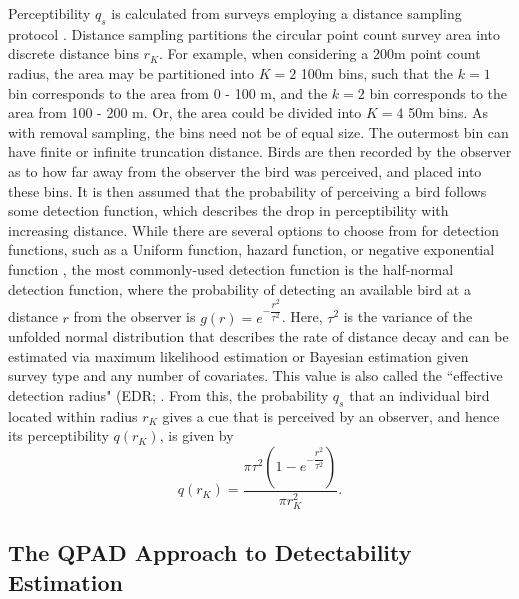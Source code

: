 \par Perceptibility $q_s$ is calculated from surveys employing a distance sampling protocol \citep{buckland_introduction_2001, buckland_distance_2015}. 
Distance sampling partitions the circular point count survey area into discrete distance bins $r_K$. 
For example, when considering a 200m point count radius, the area may be partitioned into $K = 2$ 100m bins, such that the $k = 1$ bin corresponds to the area from 0 - 100 m, and the $k = 2$ bin corresponds to the area from 100 - 200 m. 
Or, the area could be divided into $K = 4$ 50m bins. 
As with removal sampling, the bins need not be of equal size.
The outermost bin can have finite or infinite truncation distance.
Birds are then recorded by the observer as to how far away from the observer the bird was perceived, and placed into these bins.
It is then assumed that the probability of perceiving a bird follows some detection function, which describes the drop in perceptibility with increasing distance.
While there are several options to choose from for detection functions, such as a Uniform function, hazard function, or negative exponential function \citep{buckland_distance_2015}, the most commonly-used detection function is the half-normal detection function, where the probability of detecting an available bird at a distance $r$ from the observer is $g(r) = e^{-\dfrac{r^2}{\tau^2}}$. Here, $\tau^2$ is the variance of the unfolded normal distribution that describes the rate of distance decay and can be estimated via maximum likelihood estimation or Bayesian estimation given survey type and any number of covariates. 
This value is also called the ``effective detection radius" (EDR; \citet{buckland_introduction_2001}.
From this, the probability $q_s$ that an individual bird located within radius $r_K$ gives a cue that is perceived by an observer, and hence its perceptibility $q(r_K)$, is given by
\begin{equation*}
	q(r_K) = \dfrac{\pi \tau^2 \left(1 - e^{-\dfrac{r^2}{\tau^2}}\right)}{\pi r^2_K}.
\end{equation*}

\subsection{The QPAD Approach to Detectability Estimation}\label{subsection:qpad-model}

